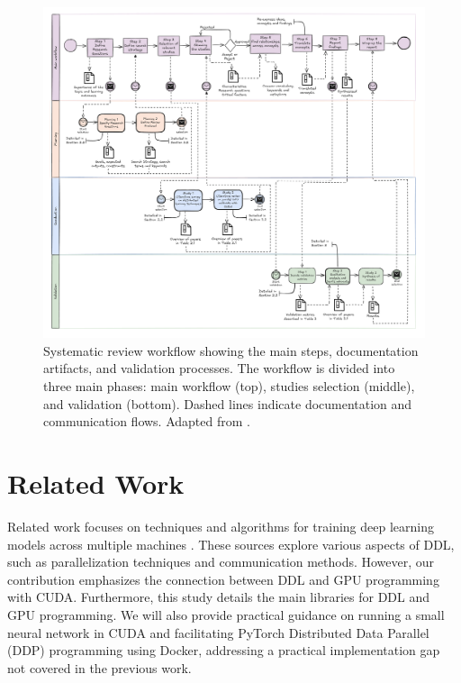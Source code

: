 
\begin{figure}[th]
	\centering
	\includegraphics[width=\linewidth]{figures/workflow2}
	\caption{Systematic review workflow showing the main steps, documentation artifacts, and validation processes.
		The workflow is divided into three main phases: main workflow (top), studies selection (middle), and
		validation (bottom). Dashed lines indicate documentation and communication flows. Adapted from \cite{dos_santos_sustainable_2024}.}
	\label{fig:workflow}
\end{figure}

\section{Related Work}


Related work focuses on techniques and algorithms for training deep learning models across multiple
machines \cite{dehghani_distributed_2023, chahal_hitchhikers_2018, berloco_systematic_2022}. These
sources explore various aspects of DDL, such as parallelization techniques and communication
methods. However, our contribution emphasizes the connection between DDL and GPU programming with
CUDA. Furthermore, this study details the main libraries for DDL and GPU programming. We will also
provide practical guidance on running a small neural network in CUDA and facilitating PyTorch
Distributed Data Parallel (DDP) programming using Docker, addressing a practical implementation gap
not covered in the previous work. 

